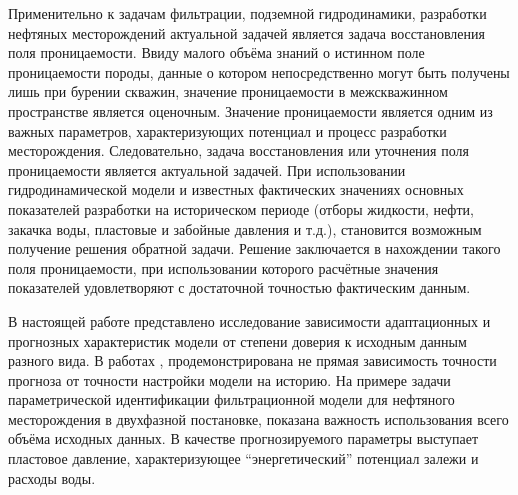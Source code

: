 \documentclass{article}
\begin{document}
	Применительно к задачам фильтрации, подземной гидродинамики, разработки нефтяных месторождений актуальной задачей является задача восстановления поля проницаемости. Ввиду малого объёма знаний о истинном поле проницаемости породы, данные о котором непосредственно могут быть получены лишь при бурении скважин, значение проницаемости в межскважинном пространстве является оценочным. Значение проницаемости является одним из  важных параметров, характеризующих потенциал и процесс разработки месторождения. Следовательно, задача восстановления или уточнения поля проницаемости является актуальной задачей. При использовании гидродинамической модели и известных фактических значениях основных показателей разработки на историческом периоде (отборы жидкости, нефти, закачка воды, пластовые и забойные давления и т.д.), становится возможным получение решения обратной задачи. Решение заключается в нахождении такого поля проницаемости, при использовании которого расчётные значения показателей удовлетворяют с достаточной точностью фактическим данным.

	В настоящей работе представлено исследование зависимости адаптационных и прогнозных характеристик модели от степени доверия к исходным данным разного вида. В работах \cite{mus}, \cite{kos} продемонстрирована не прямая зависимость точности прогноза от точности настройки модели на историю. На примере задачи параметрической идентификации фильтрационной модели для нефтяного месторождения в двухфазной постановке, показана важность использования всего объёма исходных данных. В качестве прогнозируемого параметры выступает пластовое давление, характеризующее “энергетический” потенциал залежи и расходы воды.
\end{document}
